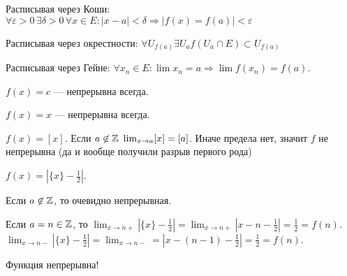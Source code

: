 \begin{definition}
    Расписывая через Коши:  $\forall \varepsilon > 0 \, \exists \delta > 0 \, \forall x \in E: |x-a| < \delta \Rightarrow |f(x) = f(a)| < \varepsilon$
\end{definition}
\begin{definition}
    Расписывая через окрестности: $\forall U_{f(a)} \exists U_a f(U_a \cap E) \subset U_{f(a)}$
\end{definition}
\begin{definition}
    Расписывая через Гейне: $\forall x_n \in E: \lim x_n = a \Rightarrow \lim f(x_n) = f(a)$.
\end{definition}
\begin{example}
    $f(x) = c$ --- непрерывна всегда.
\end{example}
\begin{example}
    $f(x) = x$ --- непрерывна всегда.
\end{example}
\begin{example}
	$f(x) = [x]$. Если  $a \not \in \mathbb{Z} \ \lim_{x\to a} [x] = [a]$. Иначе предела нет, значит $f$ не непрерывна (да и вообще получили разрыв первого рода)
\end{example}
\begin{example}
    $f(x) = |\{x\} - \frac{1}{2}|$.

    Если $a \not \in \mathbb{Z}$, то очевидно непрерывная.

    Если $a = n \in \mathbb{Z}$, то  $\lim_{x \to n+} |\{x\} - \frac{1}{2} | = \lim_{x \to n+} |x-n-\frac{1}{2}| = \frac{1}{2} = f(n)$. $\lim_{x \to n-} |\{x\} - \frac{1}{2}| = \lim_{x\to n-} = |x-(n-1)-\frac{1}{2}| = \frac{1}{2} = f(n)$.

    Функция непрерывна!
\end{example}


